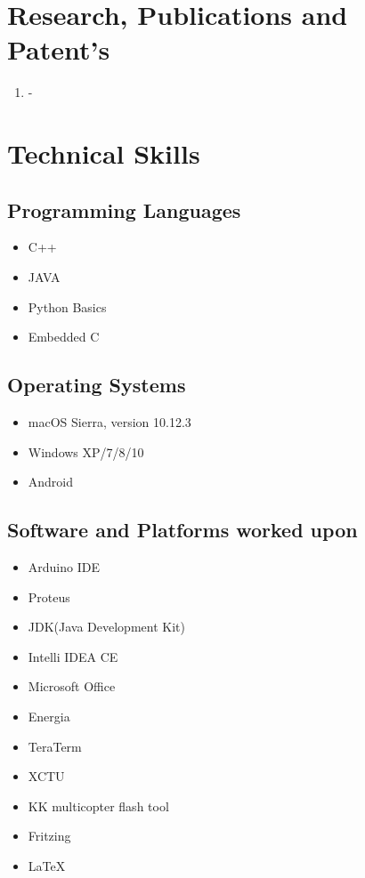 \documentclass[11pt]{article}
\begin{document}
\begin{minipage}{1.5\linewidth}

\section{\color{blue}Res\color{black}earch, Publications and Patent's}
\begin{enumerate}
\item -
\end{enumerate}

\section{\color{cyan}Tec\color{black}hnical Skills}
\subsection{Programming Languages}
\begin{itemize}
\item C++
\item JAVA
\item Python Basics
\item Embedded C
\end{itemize}

\subsection{Operating Systems}
\begin{itemize}
\item macOS Sierra, version 10.12.3
\item Windows XP/7/8/10
\item Android
\end{itemize}
\subsection{Software and Platforms worked upon}
\begin{itemize}
\item Arduino IDE
\item Proteus
\item JDK(Java Development Kit)
\item Intelli IDEA CE
\item Microsoft Office
\item Energia
\item TeraTerm
\item XCTU
\item KK multicopter flash tool
\item Fritzing
\item LaTeX
\end{itemize}

\end{minipage}
\end{document}
